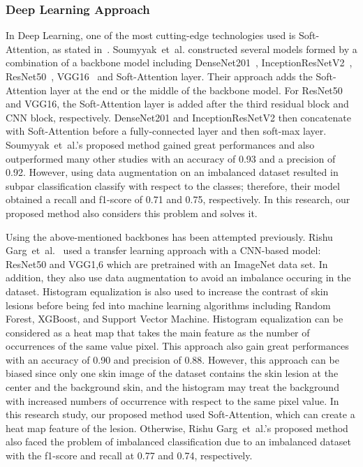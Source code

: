 \documentclass[sensors,article,accept,pdftex,moreauthors]{Definitions/mdpi}
\begin{document}
{		\subsubsection{Deep Learning Approach}
		In Deep Learning, one of the most cutting-edge technologies  used is Soft-Attention, as stated in~\mbox{\cite{03358}}. Soumyyak~et~al. constructed several models formed by a combination of a backbone model including DenseNet201~\mbox{\cite{06993}}, InceptionResNetV2~\mbox{\cite{00567}}, ResNet50~\mbox{\cite{03385,05027}}, VGG16~\mbox{\cite{1556}} and Soft-Attention layer. Their approach adds the Soft-Attention layer at the end or the middle of the backbone model. For ResNet50 and VGG16, the Soft-Attention layer is added after the third residual block and CNN block, respectively. DenseNet201 and InceptionResNetV2 then concatenate with  Soft-Attention before a fully-connected layer and then soft-max layer. Soumyyak~et~al.'s proposed method gained great performances and also outperformed many other studies with an accuracy of 0.93 and a precision of 0.92. However, using  data augmentation on an imbalanced dataset resulted in subpar classification  classify with respect to the  classes; therefore, their model obtained a  recall and f1-score of 0.71 and 0.75, respectively. In this research, our proposed method also considers this problem and solves it.
		
		Using the above-mentioned backbones has been attempted previously. Rishu Garg~et~al.~\mbox{\cite{03798}} used a transfer learning approach with a CNN-based model: ResNet50 and VGG1,6 which are pretrained with an ImageNet data set. In addition, they also use data augmentation to avoid an imbalance occuring in  the dataset. Histogram equalization is also used to increase the contrast of  skin lesions before being fed into machine learning algorithms including Random Forest, XGBoost, and Support Vector Machine.	Histogram equalization can be considered as a heat map that takes the main feature as the number of occurrences of the same value pixel. This approach also gain great performances with an accuracy of 0.90 and  precision of 0.88. However, this approach can be biased since only one skin image of the dataset contains the skin lesion at the center and the background skin, and the histogram may treat the background with increased numbers of occurrence with respect to the same pixel value. In this research study, our proposed method used  Soft-Attention, which can create a heat map feature of the lesion. Otherwise, Rishu Garg~et~al.'s proposed method also faced the problem of imbalanced classification due to an imbalanced dataset with the f1-score and recall at 0.77 and 0.74, respectively.
		
}
\end{document}
